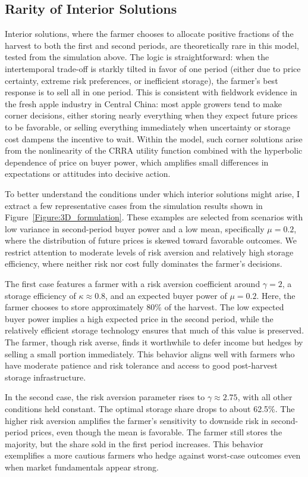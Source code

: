 \subsection{Rarity of Interior Solutions}
Interior solutions, where the farmer chooses to allocate positive fractions of the harvest to both the first and second periods, are theoretically rare in this model, tested from the simulation above. The logic is straightforward: when the intertemporal trade-off is starkly tilted in favor of one period (either due to price certainty, extreme risk preferences, or inefficient storage), the farmer's best response is to sell all in one period. This is consistent with fieldwork evidence in the fresh apple industry in Central China: most apple growers tend to make corner decisions, either storing nearly everything when they expect future prices to be favorable, or selling everything immediately when uncertainty or storage cost dampens the incentive to wait. Within the model, such corner solutions arise from the nonlinearity of the CRRA utility function combined with the hyperbolic dependence of price on buyer power, which amplifies small differences in expectations or attitudes into decisive action.

To better understand the conditions under which interior solutions might arise, I extract a few representative cases from the simulation results shown in Figure~\ref{Figure:3D_formulation}. These examples are selected from scenarios with low variance in second-period buyer power and a low mean, specifically $\mu = 0.2$, where the distribution of future prices is skewed toward favorable outcomes. We restrict attention to moderate levels of risk aversion and relatively high storage efficiency, where neither risk nor cost fully dominates the farmer's decisions.

The first case features a farmer with a risk aversion coefficient around $\gamma = 2$, a storage efficiency of $\kappa \approx 0.8$, and an expected buyer power of $\mu = 0.2$. Here, the farmer chooses to store approximately 80\% of the harvest. The low expected buyer power implies a high expected price in the second period, while the relatively efficient storage technology ensures that much of this value is preserved. The farmer, though risk averse, finds it worthwhile to defer income but hedges by selling a small portion immediately. This behavior aligns well with farmers who have moderate patience and risk tolerance and access to good post-harvest storage infrastructure.

In the second case, the risk aversion parameter rises to $\gamma \approx 2.75$, with all other conditions held constant. The optimal storage share drops to about 62.5\%. The higher risk aversion amplifies the farmer's sensitivity to downside risk in second-period prices, even though the mean is favorable. The farmer still stores the majority, but the share sold in the first period increases. This behavior exemplifies a more cautious farmers who hedge against worst-case outcomes even when market fundamentals appear strong.

